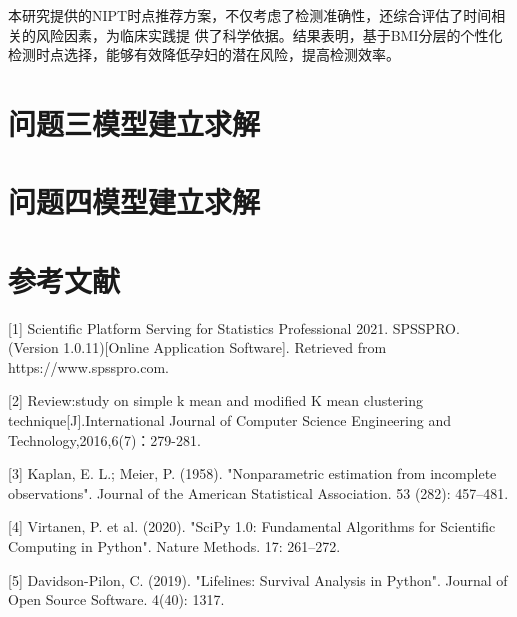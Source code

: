 \documentclass{article}
\begin{document}
本研究提供的NIPT时点推荐方案，不仅考虑了检测准确性，还综合评估了时间相关的风险因素，为临床实践提
供了科学依据。结果表明，基于BMI分层的个性化检测时点选择，能够有效降低孕妇的潜在风险，提高检测效率。
\section{\textbf{问题三模型建立求解}}
\section{\textbf{问题四模型建立求解}}
\section{\textbf{参考文献}}
 [1] Scientific Platform Serving for Statistics Professional 2021. SPSSPRO.
(Version 1.0.11)[Online Application Software]. Retrieved from https://www.spsspro.com.

[2] Review:study on simple k mean and modified K mean clustering
technique[J].International Journal of Computer Science Engineering and Technology,2016,6(7)：279-281.

[3] Kaplan, E. L.; Meier, P. (1958). "Nonparametric estimation from incomplete
observations". Journal of the American Statistical Association. 53 (282): 457–481.

[4] Virtanen, P. et al. (2020). "SciPy 1.0: Fundamental Algorithms for Scientific
Computing in Python". Nature Methods. 17: 261–272.

[5] Davidson-Pilon, C. (2019). "Lifelines: Survival Analysis in Python". Journal
of Open Source Software. 4(40): 1317.
\newpage
\section*{}

\end{document}
